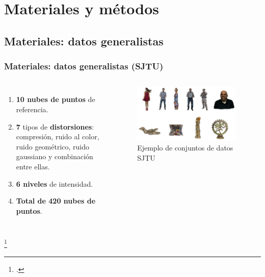 \section{Materiales y métodos}

\subsection{Materiales: datos generalistas}
\begin{frame}
    \frametitle{Materiales: datos generalistas (SJTU)}
    \begin{columns}
      \begin{enumerate}
        \item \textbf{10 nubes de puntos} de referencia.  
        \item \textbf{7} tipos de \textbf{distorsiones}: compresión, ruido al color, 
          ruido geométrico, ruido gaussiano y combinación entre ellas.
        \item \textbf{6 niveles} de intensidad.
        \item \textbf{Total de 420 nubes de puntos}.
      \end{enumerate}
      \begin{figure}
        \includegraphics[width=0.95\textwidth]{imagenes/chapter3/SJTU}
        \caption{Ejemplo de conjuntos de datos SJTU\footnotemark}
        \label{fig:SJTU}
      \end{figure}
    \end{columns}
    \footcitetext{SJTU}
\end{frame}

